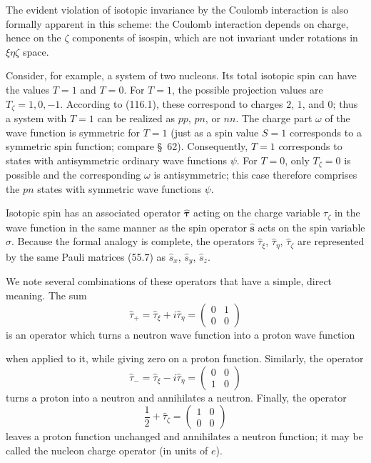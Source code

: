 The evident violation of isotopic invariance by the Coulomb interaction is
also formally apparent in this scheme: the Coulomb interaction depends on
charge, hence on the $\zeta$ components of isospin, which are not invariant
under rotations in $\xi\eta\zeta$ space.

Consider, for example, a system of two nucleons. Its total isotopic spin can
have the values $T=1$ and $T=0$. For $T=1$, the possible projection values are
$T_\zeta=1,0,-1$. According to (116.1), these correspond to charges $2$, $1$,
and $0$; thus a system with $T=1$ can be realized as $pp$, $pn$, or $nn$. The
charge part $\omega$ of the wave function is symmetric for $T=1$ (just as a
spin value $S=1$ corresponds to a symmetric spin function; compare \S~62).
Consequently, $T=1$ corresponds to states with antisymmetric ordinary wave
functions $\psi$. For $T=0$, only $T_\zeta=0$ is possible and the corresponding
$\omega$ is antisymmetric; this case therefore comprises the $pn$ states with
symmetric wave functions $\psi$.

Isotopic spin has an associated operator $\hat{\boldsymbol\tau}$ acting on the
charge variable $\tau_\zeta$ in the wave function in the same manner as the
spin operator $\hat{\mathbf s}$ acts on the spin variable $\sigma$. Because the
formal analogy is complete, the operators $\hat\tau_\xi$, $\hat\tau_\eta$,
$\hat\tau_\zeta$ are represented by the same Pauli matrices (55.7) as
$\hat s_x$, $\hat s_y$, $\hat s_z$.

We note several combinations of these operators that have a simple, direct
meaning. The sum
\[
 \hat\tau_+=\hat\tau_\xi+i\hat\tau_\eta=
 \begin{pmatrix}0&1\\0&0\end{pmatrix}
\]
is an operator which turns a neutron wave function into a proton wave function

when applied to it, while giving zero on a proton function. Similarly, the
operator
\[
 \hat\tau_-=\hat\tau_\xi-i\hat\tau_\eta=
 \begin{pmatrix}0&0\\1&0\end{pmatrix}
\]
turns a proton into a neutron and annihilates a neutron. Finally, the operator
\[
 \frac12+\hat\tau_\zeta=\begin{pmatrix}1&0\\0&0\end{pmatrix}
\]
leaves a proton function unchanged and annihilates a neutron function; it may
be called the nucleon charge operator (in units of $e$).

